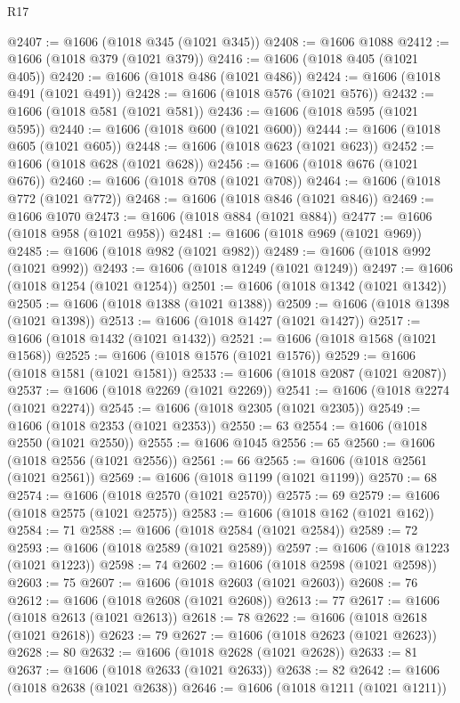 \begin{lexlean}{R17}
\begin{coremodule}
{{{{{{{{{{{{{{{{{{{{{{{{{{{{{{{{{{{{{{{{{{{{{{{{{{{{{{{{{{{{{{{{{{{{{{{{{{{{{{{{{{{{{{{{{{{{{{{{{{{{{{{{{{{@2407 := @1606 (@1018 @345 (@1021 @345))
@2408 := @1606 @1088
@2412 := @1606 (@1018 @379 (@1021 @379))
@2416 := @1606 (@1018 @405 (@1021 @405))
@2420 := @1606 (@1018 @486 (@1021 @486))
@2424 := @1606 (@1018 @491 (@1021 @491))
@2428 := @1606 (@1018 @576 (@1021 @576))
@2432 := @1606 (@1018 @581 (@1021 @581))
@2436 := @1606 (@1018 @595 (@1021 @595))
@2440 := @1606 (@1018 @600 (@1021 @600))
@2444 := @1606 (@1018 @605 (@1021 @605))
@2448 := @1606 (@1018 @623 (@1021 @623))
@2452 := @1606 (@1018 @628 (@1021 @628))
@2456 := @1606 (@1018 @676 (@1021 @676))
@2460 := @1606 (@1018 @708 (@1021 @708))
@2464 := @1606 (@1018 @772 (@1021 @772))
@2468 := @1606 (@1018 @846 (@1021 @846))
@2469 := @1606 @1070
@2473 := @1606 (@1018 @884 (@1021 @884))
@2477 := @1606 (@1018 @958 (@1021 @958))
@2481 := @1606 (@1018 @969 (@1021 @969))
@2485 := @1606 (@1018 @982 (@1021 @982))
@2489 := @1606 (@1018 @992 (@1021 @992))
@2493 := @1606 (@1018 @1249 (@1021 @1249))
@2497 := @1606 (@1018 @1254 (@1021 @1254))
@2501 := @1606 (@1018 @1342 (@1021 @1342))
@2505 := @1606 (@1018 @1388 (@1021 @1388))
@2509 := @1606 (@1018 @1398 (@1021 @1398))
@2513 := @1606 (@1018 @1427 (@1021 @1427))
@2517 := @1606 (@1018 @1432 (@1021 @1432))
@2521 := @1606 (@1018 @1568 (@1021 @1568))
@2525 := @1606 (@1018 @1576 (@1021 @1576))
@2529 := @1606 (@1018 @1581 (@1021 @1581))
@2533 := @1606 (@1018 @2087 (@1021 @2087))
@2537 := @1606 (@1018 @2269 (@1021 @2269))
@2541 := @1606 (@1018 @2274 (@1021 @2274))
@2545 := @1606 (@1018 @2305 (@1021 @2305))
@2549 := @1606 (@1018 @2353 (@1021 @2353))
@2550 := 63
@2554 := @1606 (@1018 @2550 (@1021 @2550))
@2555 := @1606 @1045
@2556 := 65
@2560 := @1606 (@1018 @2556 (@1021 @2556))
@2561 := 66
@2565 := @1606 (@1018 @2561 (@1021 @2561))
@2569 := @1606 (@1018 @1199 (@1021 @1199))
@2570 := 68
@2574 := @1606 (@1018 @2570 (@1021 @2570))
@2575 := 69
@2579 := @1606 (@1018 @2575 (@1021 @2575))
@2583 := @1606 (@1018 @162 (@1021 @162))
@2584 := 71
@2588 := @1606 (@1018 @2584 (@1021 @2584))
@2589 := 72
@2593 := @1606 (@1018 @2589 (@1021 @2589))
@2597 := @1606 (@1018 @1223 (@1021 @1223))
@2598 := 74
@2602 := @1606 (@1018 @2598 (@1021 @2598))
@2603 := 75
@2607 := @1606 (@1018 @2603 (@1021 @2603))
@2608 := 76
@2612 := @1606 (@1018 @2608 (@1021 @2608))
@2613 := 77
@2617 := @1606 (@1018 @2613 (@1021 @2613))
@2618 := 78
@2622 := @1606 (@1018 @2618 (@1021 @2618))
@2623 := 79
@2627 := @1606 (@1018 @2623 (@1021 @2623))
@2628 := 80
@2632 := @1606 (@1018 @2628 (@1021 @2628))
@2633 := 81
@2637 := @1606 (@1018 @2633 (@1021 @2633))
@2638 := 82
@2642 := @1606 (@1018 @2638 (@1021 @2638))
@2646 := @1606 (@1018 @1211 (@1021 @1211))
}}}}}}}}}}}}}}}}}}}}}}}}}}}}}}}}}}}}}}}}}}}}}}}}}}}}}}}}}}}}}}}}}}}}}}}}}}}}}}}}}}}}}}}}}}}}}}}}}}}}}}}}}}}
\end{coremodule}
\end{lexlean}
